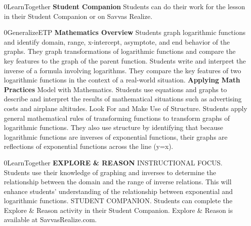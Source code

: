 \documentclass{article}
\newenvironment{te-addendum}[2]{}{}     %
\newcommand{\placeholder}[2]{}          %
\begin{document}
\begin{te-addendum}{0}{LearnTogether}
\textbf{Student Companion}
Students can do their work for the lesson in their Student Companion or on Savvas Realize.
\placeholder{illustration}{Student Companion cover: luminous purple and blue circular design on black; Student Companion, enVision Algebra 2, SAVVAS.}
\end{te-addendum}
\begin{te-addendum}{0}{GeneralizeETP}
\textbf{Mathematics Overview}
Students graph logarithmic functions and identify domain, range, x-intercept, asymptote, and end behavior of the graphs. They graph transformations of logarithmic functions and compare the key features to the graph of the parent function.
Students write and interpret the inverse of a formula involving logarithms. They compare the key features of two logarithmic functions in the context of a real-world situation.
\textbf{Applying Math Practices}
Model with Mathematics. Students use equations and graphs to describe and interpret the results of mathematical situations such as advertising costs and airplane altitudes.
Look For and Make Use of Structure. Students apply general mathematical rules of transforming functions to transform graphs of logarithmic functions. They also use structure by identifying that because logarithmic functions are inverses of exponential functions, their graphs are reflections of exponential functions across the line (y=x).
\end{te-addendum}
\begin{te-addendum}{0}{LearnTogether}
\textbf{EXPLORE \& REASON}
INSTRUCTIONAL FOCUS. Students use their knowledge of graphing and inverses to determine the relationship between the domain and the range of inverse relations. This will enhance students' understanding of the relationship between exponential and logarithmic functions.
STUDENT COMPANION. Students can complete the Explore \& Reason activity in their Student Companion.
Explore \& Reason is available at SavvasRealize.com.
\end{te-addendum}
\end{document}

